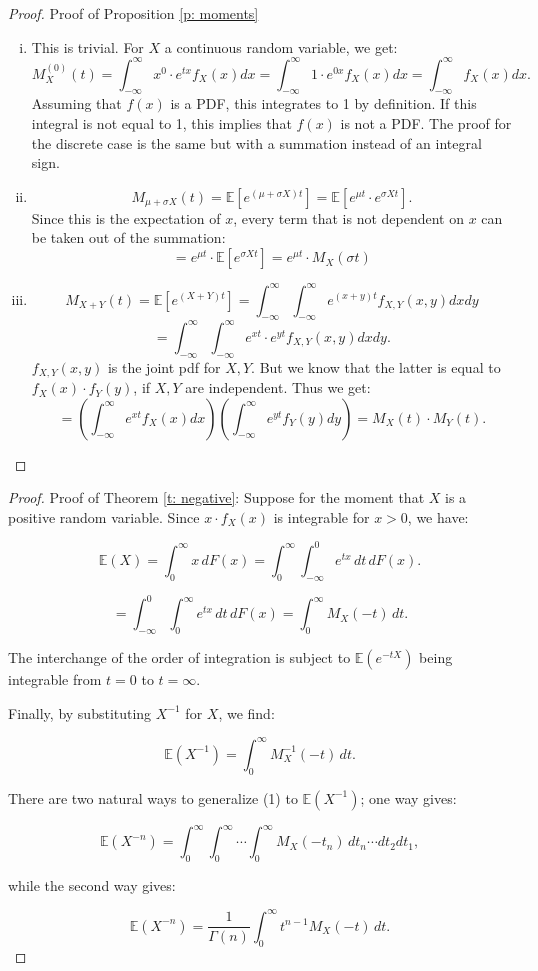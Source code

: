 \begin{proof}
    Proof of Proposition \ref{p: moments}
    \begin{enumerate}[(i)]
        \item This is trivial. For \(X\) a continuous random variable, we get: 
        \[ M_X^{(0)}(t) = \int_{-\infty}^{\infty} x^0 \cdot e^{t x } f_X(x) dx = \int_{-\infty}^{\infty} 1 \cdot e^{0 x } f_X(x) dx = \int_{-\infty}^{\infty} f_X(x) dx.\] Assuming that \(f(x)\) is a PDF, this integrates to 1 by definition. If this integral is not equal to 1, this implies that \(f(x)\) is not a PDF. The proof for the discrete case is the same but with a summation instead of an integral sign.
        \item \[M_{\mu + \sigma X}(t) = \mathbb{E}[e^{(\mu + \sigma X)t}] = \mathbb{E}[e^{\mu t} \cdot e^{\sigma X t}].\] Since this is the expectation of \(x\), every term that is not dependent on \(x\) can be taken out of the summation:
        \[ = e^{\mu t} \cdot \mathbb{E}[e^{\sigma X t}] = e^{\mu t} \cdot M_{ X}(\sigma t)\]
        \item 
        \[M_{X+Y}(t) = \mathbb{E}[e^{(X + Y)t}] = \int_{-\infty}^{\infty} \int_{-\infty}^{\infty} e^{(x + y)t} f_{X, Y}(x, y) dx dy\] 
        \[= \int_{-\infty}^{\infty} \int_{-\infty}^{\infty} e^{xt} \cdot e^{yt} f_{X, Y}(x, y) dx dy.\] 
        \(f_{X, Y}(x, y)\) is the joint pdf for \(X, Y\). But we know that the latter is equal to \(f_X(x) \cdot f_Y(y)\), if \(X, Y\) are independent. Thus we get:
        \[ = \left(\int_{-\infty}^{\infty}  e^{xt} f_X(x) dx\right) \left(\int_{-\infty}^{\infty}  e^{yt} f_Y(y) dy\right) = M_X(t) \cdot M_Y(t).\] 
    \end{enumerate}
\end{proof}

\begin{proof}
    Proof of Theorem \ref{t: negative}:
Suppose for the moment that \( X \) is a positive random variable. Since \( x \cdot f_X(x) \) is integrable for \( x > 0 \), we have:

\[
    \mathbb{E}(X) = \int_0^\infty x \, dF(x) = \int_0^\infty \int_{-\infty}^0 e^{tx} \, dt \, dF(x).
\]


\[
    =  \int_{-\infty}^0 \int_0^\infty e^{tx} \, dt \, dF(x) = \int_0^\infty M_X(-t) \, dt.
\]

The interchange of the order of integration is subject to \( \mathbb{E}(e^{-tX}) \) being integrable from \( t = 0 \) to \( t = \infty \).

Finally, by substituting \( X^{-1} \) for \( X \), we find:

\[
    \mathbb{E}(X^{-1}) = \int_0^\infty M_X^{-1}(-t) \, dt.
\]

There are two natural ways to generalize (1) to \( \mathbb{E}(X^{-1}) \); one way gives:

\[
    \mathbb{E}(X^{-n}) = \int_0^\infty \int_0^\infty \cdots \int_0^\infty M_X(-t_n) \, dt_n \cdots dt_2 dt_1, \tag{2}
\]

while the second way gives:

\[
    \mathbb{E}(X^{-n}) = \frac{1}{\Gamma(n)} \int_0^\infty t^{n-1} M_X(-t) \, dt.
\]
\citep{cressie1981}
\end{proof}

